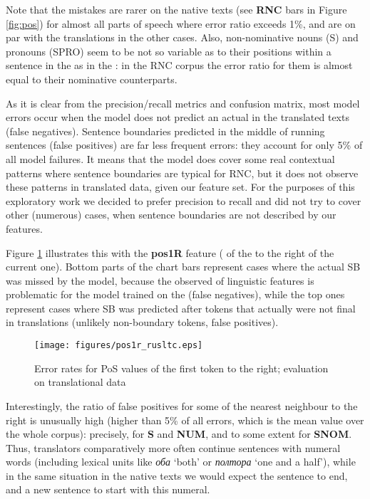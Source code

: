 \documentclass[output=paper]{langsci/langscibook.cls}
\begin{document}
Note that the mistakes are rarer on the native texts (see \textbf{RNC} bars in Figure \ref{fig:pos}) for almost all parts of speech where error ratio exceeds 1\%, and are on par with the translations in the other cases. Also, non-nominative nouns (S) and pronouns (SPRO) seem to be not so variable as to their positions within a sentence in the  as in the : in the RNC corpus the error ratio for them is almost equal to their nominative counterparts.

As it is clear from the precision/recall metrics and confusion matrix, most model errors occur when the model does not predict an actual  in the translated texts (false negatives). Sentence boundaries predicted in the middle of running sentences (false positives) are far less frequent errors: they account for only 5\% of all model failures. It means that the model does cover some real contextual patterns where sentence boundaries are typical for RNC, but it does not observe these patterns in translated data, given our feature set. For the purposes of this exploratory work we decided to prefer precision to recall and did not try to cover other (numerous) cases, when sentence boundaries are not described by our features.  

Figure \ref{fig:pos1r} illustrates this with the \textbf{pos1R} feature ( of the  to the right of the current one). Bottom parts of the chart bars represent cases where the actual SB was missed by the model, because the observed  of linguistic features is problematic for the model trained on the   (false negatives), while the top ones represent cases where SB was predicted after tokens that actually were not final in translations (unlikely non-boundary tokens, false positives).

\begin{figure}
\caption{Error rates for PoS values of the first token to the right; evaluation on translational data}
\texttt{[image: figures/pos1r\_rusltc.eps]}
\label{fig:pos1r}
\end{figure}

\newpage 
Interestingly, the ratio of false positives for some  of the nearest neighbour to the right is unusually high (higher than 5\% of all errors, which is the mean value over the whole corpus): precisely, for \textbf{S} and \textbf{NUM}, and to some extent for \textbf{SNOM}. Thus, translators comparatively more often continue sentences with numeral words (including lexical units like \textit{оба} `both' or \textit{полтора} `one and a half'), while in the same situation in the native texts we would expect the sentence to end, and a new sentence to start with this numeral. 
\end{document}
